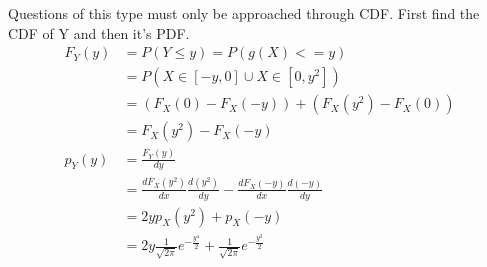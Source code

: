 \documentclass[../../probability-notes.tex]{subfiles}
\begin{document}
        Questions of this type must only be approached through CDF. First find the CDF of Y and then it's PDF.
        \begin{align*}
            F_{Y}(y) &= P(Y \leq y) = P(g(X) <= y)\\
                    &= P(X \in [-y, 0] \cup X \in [0, y^{2}])\\
                    &= (F_{X}(0) - F_{X}(-y)) + (F_{X}(y^{2}) - F_{X}(0))\\
                    &= F_{X}(y^{2}) - F_{X}(-y)\\
            p_{Y}(y) &= \frac{F_{Y}(y)}{dy}\\
                    &= \frac{dF_{X}(y^{2})}{dx} \frac{d(y^{2})}{dy} - \frac{dF_{X}(-y)}{dx} \frac{d(-y)}{dy}\\
                    &= 2yp_{X}(y^{2}) + p_{X}(-y)\\
                    &= 2y\frac{1}{\sqrt{2\pi}}e^{-\frac{y^{4}}{2}} + \frac{1}{\sqrt{2\pi}} e^{-\frac{y^{2}}{2}}
        \end{align*}
\end{document}
